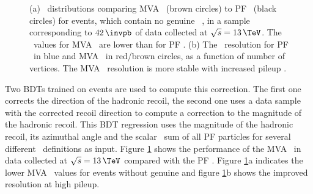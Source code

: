 \begin{figure}[h!]
\begin{center}
\end{center}
\caption[\MET~distributions comparing MVA \MET~to PF \MET~for
\Zmm events, in a sample corresponding to $42\,\invpb$ of data collected
at \mbox{$\sqrt{s}=13\,\TeV$}.]{(a) \MET~distributions comparing MVA \MET~(brown circles) to \ac{PF} \MET~(black circles) for
\Zmm events, which contain no genuine \MET~, in a sample corresponding to $42\,\invpb$ of data collected at $\sqrt{s}=13\,\TeV$. The 
\MET~values for MVA \MET~are lower than for \ac{PF} \MET. (b) The \MET~resolution for \ac{PF} \MET~in blue and MVA \MET~in red/brown
circles, as a function of number of vertices. The MVA \MET~resolution is more stable with increased pileup \cite{cms-dp-mvamet}.}
\label{fig:objects_mvamet}
\end{figure}

Two \acp{BDT} trained on \Zmm events are used to compute this correction.
The first one corrects the direction of the hadronic recoil, the second
one uses a data sample with the corrected recoil direction to compute a correction
to the magnitude of the hadronic recoil. This \ac{BDT} regression uses the magnitude of the hadronic
recoil, its azimuthal angle and the scalar \pT~sum of all \ac{PF} particles for several 
different \MET~definitions \cite{cms-met-run1} as input. Figure \ref{fig:objects_mvamet} shows
the performance of the MVA \MET~in data collected at $\sqrt{s}=13\,\TeV$ compared with 
the \ac{PF} \MET. Figure \ref{fig:objects_mvamet}a indicates the lower MVA \MET~values for events without genuine
\MET and figure \ref{fig:objects_mvamet}b shows the improved resolution at high pileup.

